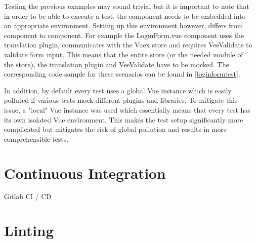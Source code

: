 Testing the previous examples may sound trivial but it is important to note that in order to be able to execute a test, the component needs to be embedded into an appropriate environment. Setting up this environment however, differs from component to component. For example the LoginForm.vue component uses the translation plugin, communicates with the Vuex store and requires VeeValidate to validate form input. This means that the entire store (or the needed module of the store), the translation plugin and VeeValidate have to be mocked. The corresponding code sample for these scenarios can be found in \autoref{loginformtest}.

In addition, by default every test uses a global Vue instance which is easily polluted if various tests mock different plugins and libraries. To mitigate this issue, a "local" Vue instance was used which essentially means that every test has its own isolated Vue environment. This makes the test setup significantly more complicated but mitigates the risk of global pollution and results in more comprehensible tests. 

\section{Continuous Integration}
Gitlab CI / CD

\section{Linting}